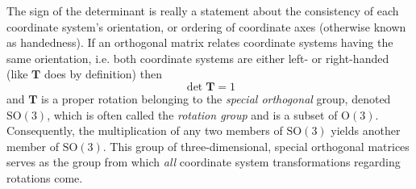 \documentclass[11pt,dvipsnames]{thesis}
\begin{document}
The sign of the determinant is really a statement about the consistency of each coordinate system's orientation, or ordering of coordinate axes (otherwise known as handedness). If an orthogonal matrix relates coordinate systems having the same orientation, i.e. both coordinate systems are either left- or right-handed (like $\mathbf{T}$ does by definition) then
\begin{equation}
\det\mathbf{T} = 1
\end{equation}
and $\mathbf{T}$ is a proper rotation belonging to the \textit{special orthogonal} group, denoted $\mathrm{SO}(3)$, which is often called the \textit{rotation group} and is a subset of $\mathrm{O}(3)$. Consequently, the multiplication of any two members of $\mathrm{SO}(3)$ yields another member of $\mathrm{SO}(3)$. This group of three-dimensional, special orthogonal matrices serves as the group from which \textit{all} coordinate system transformations regarding rotations come.
\end{document}
